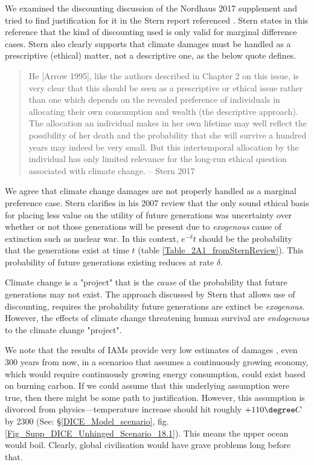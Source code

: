 \documentclass{article}
\begin{document}
We examined the discounting discussion of the Nordhaus 2017 supplement \cite{Nordhaus2017RevisitingSCC_Supplement} and tried to find justification for it in the Stern report referenced \cite{Stern2007EconomicsofClimateChangeSternReview}.  Stern states in this reference that the kind of discounting used is only valid for marginal difference cases. Stern also clearly supports that climate damages must be handled as a prescriptive (ethical) matter, not a descriptive one, as the below quote defines. 

\begin{quote}
    He [Arrow 1995], like the authors described in Chapter 2 on this issue, is very clear that this should be seen as a prescriptive or ethical issue rather than one which depends on the revealed preference of individuals in allocating their own consumption and wealth (the descriptive approach). The allocation an individual makes in her own lifetime may well reflect the possibility of her death and the probability that she will survive a hundred years may indeed be very small. But this intertemporal allocation by the individual has only limited relevance for the long-run ethical question associated with climate change. -- Stern 2017 \cite[p. 47]{Stern2007EconomicsofClimateChangeSternReview}
\end{quote}

We agree that climate change damages are not properly handled as a marginal preference case. Stern clarifies in his 2007 review that the only sound ethical basis for placing less value on the utility of future generations was uncertainty over whether or not those generations will  be present due to \emph{exogenous} cause of extinction such as nuclear war. In this context, $e^{-\delta} t$ should be the probability that the generations exist at time $t$ (table \ref{Table_2A1_fromSternReview}). This probability of future generations existing reduces at rate $\delta$. 

Climate change is a "project" that is the \emph{cause} of the probability that future generations may not exist. The approach discussed by Stern \cite[Table 2A1, p. 47]{Stern2007EconomicsofClimateChangeSternReview} that allows use of discounting, requires the probability future generations are extinct be \emph{exogenous}. However, the effects of climate change threatening human survival are \emph{endogenous} to the climate change "project". 

We note that the results of IAMs provide very low estimates of damages \cite{Howard2021GaugingConsensusClimateChange,Howard2017Meta-analysisOFClimateDamageEstimates}, even 300 years from now, in a scenarioo that assumes a continuously growing economy, which would require continuously growing energy consumption, could exist based on burning carbon. If we could assume that this underlying assumption were true, then there might be some path to justification. However, this assumption is divorced from physics---temperature increase should hit roughly $+110\degree C$ by 2300 (See: \S \ref{DICE_Model_scenario}, fig. \ref{Fig_Supp_DICE_Unhinged_Scenario_18.1}). This means the upper ocean would boil. Clearly, global civilisation would have grave problems long before that. 
\end{document}
